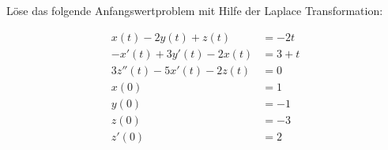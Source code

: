 
Löse das folgende Anfangswertproblem mit Hilfe der Laplace Transformation:

\begin{align}
	x(t)-2y(t)+z(t) &= -2t\\
	-x'(t)+3y'(t)-2x(t) &= 3+t\\
	3z''(t)-5x'(t)-2z(t)&=0\\
	x(0)&=1\\
	y(0)&=-1\\
	z(0)&=-3\\
	z'(0)&=2
\end{align}